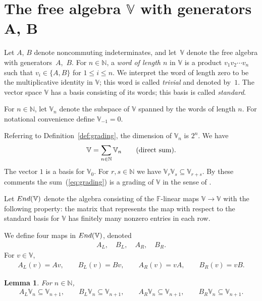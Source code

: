 \documentclass[11pt]{article}
\numberwithin{equation}{section}
\numberwithin{equation}{section}
\newtheorem{Lemma}[Theorem]{Lemma}
\begin{document}
{\section[The free algebra $\mathbb V$ with generators $A$, $B$]{The free algebra $\boldsymbol{\mathbb V}$ with generators $\boldsymbol{A}$, $\boldsymbol{B}$}\label{section3}

Let $A$, $B$ denote noncommuting indeterminates, and let~$\mathbb V$ denote the free algebra
with genera\-tors~$A$,~$B$. For $n \in \mathbb N$, a {\it word of length $n$} in $\mathbb V$
is a product $v_1 v_2 \cdots v_n$ such that $v_i \in \lbrace A, B\rbrace$
for $1 \leq i \leq n$. We interpret the word of length zero
 to be the multiplicative identity in $\mathbb V$; this word is called {\it trivial} and denoted by~$1$.
The vector space $\mathbb V$ has a basis consisting of its words; this basis is called {\it standard}.

\begin{Definition}\label{def:grading}For $n \in \mathbb N$, let ${\mathbb V}_n$ denote the
subspace of $\mathbb V$ spanned by the words of length $n$. For notational convenience define ${\mathbb V}_{-1}=0$.
\end{Definition}

Referring to Definition~\ref{def:grading}, the dimension of ${\mathbb V}_n$ is $2^n$. We have
\begin{gather}\label{eq:grading}
\mathbb V=\sum_{n \in \mathbb N} {\mathbb V}_n \qquad \mbox{\rm (direct sum).}
\end{gather}
The vector $1$ is a basis for ${\mathbb V}_0$.
For $r,s\in \mathbb N$ we have ${\mathbb V}_r {\mathbb V}_s \subseteq
{\mathbb V}_{r+s}$.
By these comments
the sum~(\ref{eq:grading}) is a grading of $\mathbb V$ in the sense of
\cite[p.~704]{rotman}.

Let ${\rm End}(\mathbb V)$ denote the algebra consisting of the
$\mathbb F$-linear maps $\mathbb V \to \mathbb V$
with the following property: the matrix that represents the map
with respect to the standard basis for $\mathbb V$ has
 finitely many nonzero entries in each row.

\begin{Definition}\label{def:ALetc}
We define four maps in ${\rm End}(\mathbb V)$, denoted
\begin{gather}
A_L, \quad
B_L, \quad
A_R, \quad
B_R.
\label{eq:leftmult}
\end{gather}
For $v \in \mathbb V$,
\begin{gather*}
A_L(v)=Av, \qquad
B_L(v)=Bv, \qquad
A_R(v)=vA, \qquad
B_R(v)=vB.%
\end{gather*}
\end{Definition}
\begin{Lemma}\label{lem:ABraise}
For $n \in \mathbb N$,
\begin{gather*}
A_L {\mathbb V}_n \subseteq {\mathbb V}_{n+1}, \qquad
B_L {\mathbb V}_n \subseteq {\mathbb V}_{n+1}, \qquad
A_R {\mathbb V}_n \subseteq {\mathbb V}_{n+1}, \qquad
B_R {\mathbb V}_n \subseteq {\mathbb V}_{n+1}.
\end{gather*}
\end{Lemma}

}
\end{document}
